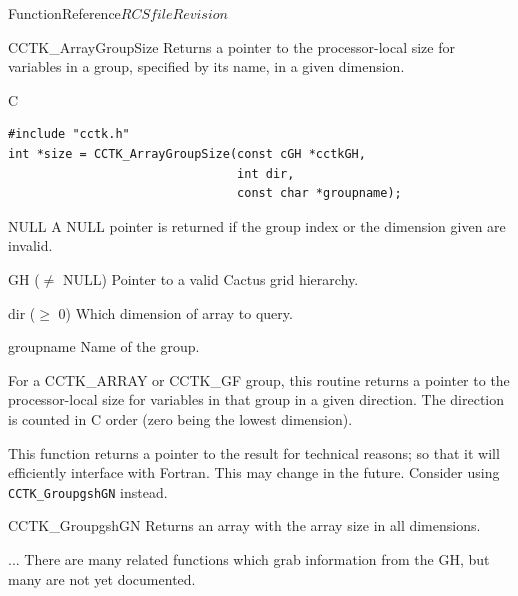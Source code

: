 \begin{cactuspart}{FunctionReference}{$RCSfile$}{$Revision$}
\begin{FunctionDescription}{CCTK\_ArrayGroupSize}{}
\label{CCTK-ArrayGroupSize}
Returns a pointer to the processor-local size for variables in a
group, specified by its name, in a given dimension.
\begin{SynopsisSection}
\begin{Synopsis}{C}
\begin{verbatim}
#include "cctk.h"
int *size = CCTK_ArrayGroupSize(const cGH *cctkGH,
                                int dir,
                                const char *groupname);
\end{verbatim}
\end{Synopsis}
\end{SynopsisSection}

\begin{ResultSection}
\begin{Result}{NULL}
A NULL pointer is returned if the group index or the dimension given are invalid.
\end{Result}
\end{ResultSection}

\begin{ParameterSection}
\begin{Parameter}{GH ($\ne$ NULL)}
Pointer to a valid Cactus grid hierarchy.
\end{Parameter}
\begin{Parameter}{dir ($\ge$ 0)}
Which dimension of array to query.
\end{Parameter}
\begin{Parameter}{groupname}
Name of the group.
\end{Parameter}
\end{ParameterSection}

\begin{Discussion}
For a CCTK\_ARRAY or CCTK\_GF group, this routine returns a pointer to
the processor-local size for variables in that group in a given
direction. The direction is counted in C order (zero being the lowest
dimension).

This function returns a pointer to the result for technical reasons;
so that it will efficiently interface with Fortran.  This may change
in the future.  Consider using \texttt{CCTK\_GroupgshGN} instead.
\end{Discussion}

\begin{SeeAlsoSection}
\begin{SeeAlso}{CCTK\_GroupgshGN}
Returns an array with the array size in all dimensions.
\end{SeeAlso}
\begin{SeeAlso}{...}
There are many related functions which grab information from the GH,
but many are not yet documented.
\end{SeeAlso}
\end{SeeAlsoSection}
\end{FunctionDescription}



\end{cactuspart}

